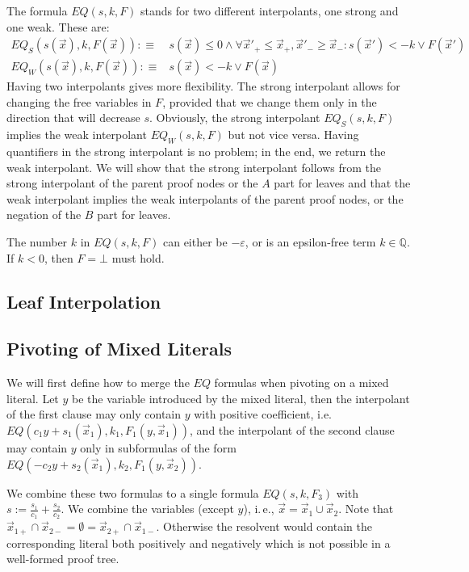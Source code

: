 \documentclass{llncs}
\begin{document}
The formula $EQ(s,k,F)$ stands for two different interpolants, one
strong and one weak.   These are:
\begin{align*}
EQ_S\left(s(\vec x), k, F(\vec x)\right) :\equiv & 
  s(\vec x) \leq 0 \land 
  \forall \vec x'_+ \leq \vec x_+, \vec x'_-\geq \vec x_-: 
	  s(\vec x') < -k \vee F(\vec x')\\
EQ_{W} \left(s(\vec x),k,F(\vec x)\right) :\equiv & 
  s(\vec x) < -k \vee F(\vec x)
\end{align*}
Having two interpolants gives more flexibility.  The strong
interpolant allows for changing the free variables in $F$, provided
that we change them only in the direction that will decrease $s$.
Obviously, the strong interpolant $EQ_S(s,k,F)$ implies the weak
interpolant $EQ_W(s,k,F)$ but not vice versa.  Having quantifiers in
the strong interpolant is no problem; in the end, we return
the weak interpolant. We will show that the strong interpolant follows
from the strong interpolant of the parent proof nodes or the $A$ part
for leaves and that the weak interpolant implies the weak
interpolants of the parent proof nodes, or the negation of the $B$
part for leaves.

The number $k$ in $EQ(s,k,F)$ can either be $-\varepsilon$, or is an
epsilon-free term $k \in \mathbb{Q}$.  If $k < 0$, then
$F = \bot$ must hold.

\subsection{Leaf Interpolation}

\subsection{Pivoting of Mixed Literals}

We will first define how to merge the $EQ$ formulas when pivoting on a
mixed literal.  Let $y$ be the variable introduced by the mixed
literal, then the interpolant of the first clause may only contain $y$
with positive coefficient, i.e. $EQ(c_1 y + s_1(\vec x_1), k_1, F_1(y,
\vec x_1))$, and the interpolant of the second clause may contain $y$
only in subformulas of the form $EQ(-c_2 y + s_2(\vec x_1), k_2,
F_1(y, \vec x_2))$.  

We combine these two formulas to a single formula $EQ(s, k, F_3)$ with
$s := \frac{s_1}{c_1} + \frac{s_2}{c_2}$.  We combine the variables
(except $y$), i.\,e., $\vec x = \vec x_1 \cup \vec x_2$.  Note that
$\vec x_{1+} \cap \vec x_{2-} = \emptyset = \vec x_{2+} \cap \vec
x_{1-}$.  Otherwise the resolvent would contain the corresponding
literal both positively and negatively which is not possible in a
well-formed proof tree.
\end{document}
